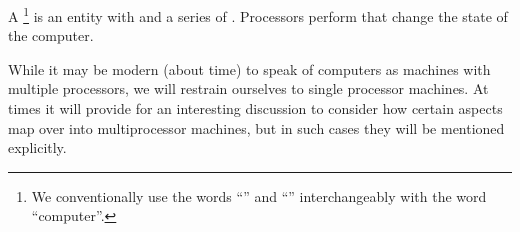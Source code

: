 \begin{definition}

A \footnote{We conventionally use the words ``'' and
``'' interchangeably with the word ``computer''.} is an entity with
 and a series of .  Processors perform 
that change the state of the computer.

\end{definition}

While it may be modern (about time) to speak of computers as machines with
multiple processors, we will restrain ourselves to single processor machines.
At times it will provide for an interesting discussion to consider how certain
aspects map over into multiprocessor machines, but in such cases they will be
mentioned explicitly.
